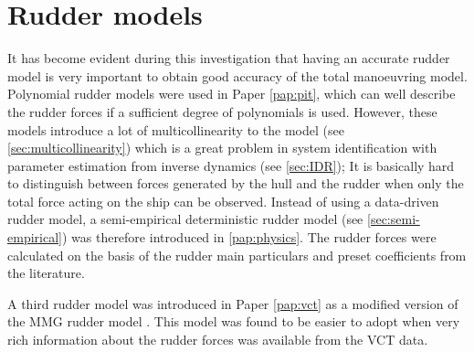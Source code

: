 \section{Rudder models} \label{sec:rudders}
It has become evident during this investigation that having an accurate rudder model is very important to obtain good accuracy of the total manoeuvring model. Polynomial rudder models were used in Paper \ref{pap:pit}, which can well describe the rudder forces if a sufficient degree of polynomials is used. However, these models introduce a lot of multicollinearity to the model (see \autoref{sec:multicollinearity}) which is a great problem in system identification with parameter estimation from inverse dynamics (see \autoref{sec:IDR}); It is basically hard to distinguish between forces generated by the hull and the rudder when only the total force acting on the ship can be observed. Instead of using a data-driven rudder model, a semi-empirical deterministic rudder model (see \autoref{sec:semi-empirical}) was therefore introduced in \ref{pap:physics}. The rudder forces were calculated on the basis of the rudder main particulars and preset coefficients from the literature.

A third rudder model was introduced in Paper \ref{pap:vct} as a modified version of the MMG rudder model \cite{yasukawa_introduction_2015}. This model was found to be easier to adopt when very rich information about the rudder forces was available from the VCT data.


